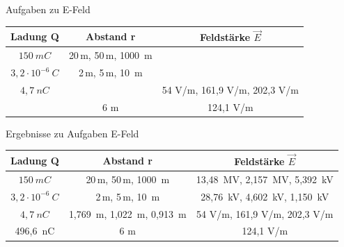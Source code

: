 \begin{frame}{Aufgaben zu E-Feld}
\begin{tabular}{c|c|c}
    Ladung Q& Abstand r& Feldstärke $\vec{E}$\\ \hline 
    $150\ mC$ & 20\,m, 50\,m, 1000\ m & \\ \hline
    $3,2\cdot 10^{-6}\ C$ & 2\,m, 5\,m, 10\ m & \\ \hline  
    $4,7\ nC$ & & 54 V/m, 161,9 V/m, 202,3 V/m\\ \hline
    & 6 m& 124,1 V/m
\end{tabular}
\end{frame}

\begin{frame}{Ergebnisse zu Aufgaben E-Feld}
\begin{tabular}{c|c|c}
    Ladung Q& Abstand r& Feldstärke $\vec{E}$\\ \hline 
    $150\ mC$ & 20\,m, 50\,m, 1000\ m & 13,48\ MV, 2,157\ MV, 5,392\ kV\\ \hline
    $3,2\cdot 10^{-6}\ C$ & 2\,m, 5\,m, 10\ m & 28,76\ kV, 4,602\ kV, 1,150\ kV\\ \hline  
    $4,7\ nC$ & 1,769\ m, 1,022\ m, 0,913\ m& 54 V/m, 161,9 V/m, 202,3 V/m\\ \hline
    496,6\ nC& 6 m& 124,1 V/m
\end{tabular}
\end{frame}
